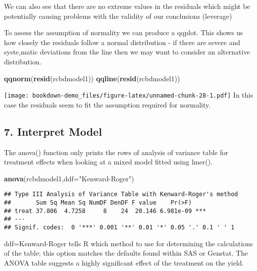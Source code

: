 \documentclass[]{book}
\newenvironment{Shaded}{\begin{snugshade}}{\end{snugshade}}
\newcommand{\KeywordTok}[1]{\textcolor[rgb]{0.13,0.29,0.53}{\textbf{#1}}}
\newcommand{\DataTypeTok}[1]{\textcolor[rgb]{0.13,0.29,0.53}{#1}}
\newcommand{\StringTok}[1]{\textcolor[rgb]{0.31,0.60,0.02}{#1}}
\newcommand{\NormalTok}[1]{#1}
\theoremstyle{definition}
\theoremstyle{definition}
\theoremstyle{definition}
\theoremstyle{remark}
\begin{document}
We can also see that there are no extreme values in the residuals which
might be potentially causing problems with the validity of our
conclusions (leverage)

To assess the assumption of normality we can produce a qqplot. This
shows us how closely the residuals follow a normal distribution - if
there are severe and syste,matic deviations from the line then we may
want to consider an alternative distribution.

\begin{Shaded}
\begin{Highlighting}[]
\KeywordTok{qqnorm}\NormalTok{(}\KeywordTok{resid}\NormalTok{(rcbdmodel1))}
\KeywordTok{qqline}\NormalTok{(}\KeywordTok{resid}\NormalTok{(rcbdmodel1))}
\end{Highlighting}
\end{Shaded}

\texttt{[image: bookdown-demo\_files/figure-latex/unnamed-chunk-28-1.pdf]}
In this case the residuals seem to fit the assumption required for
normality.

\subsection{7. Interpret Model}\label{interpret-model}

The anova() function only prints the rows of analysis of variance table
for treatment effects when looking at a mixed model fitted using lmer().

\begin{Shaded}
\begin{Highlighting}[]
\KeywordTok{anova}\NormalTok{(rcbdmodel1,}\DataTypeTok{ddf=}\StringTok{"Kenward-Roger"}\NormalTok{)}
\end{Highlighting}
\end{Shaded}

\begin{verbatim}
## Type III Analysis of Variance Table with Kenward-Roger's method
##       Sum Sq Mean Sq NumDF DenDF F value    Pr(>F)    
## treat 37.806  4.7258     8    24  20.146 6.981e-09 ***
## ---
## Signif. codes:  0 '***' 0.001 '**' 0.01 '*' 0.05 '.' 0.1 ' ' 1
\end{verbatim}

ddf=Kenward-Roger tells R which method to use for determining the
calculations of the table; this option matches the defaults found within
SAS or Genstat. The ANOVA table suggests a highly significant effect of
the treatment on the yield.
\end{document}
